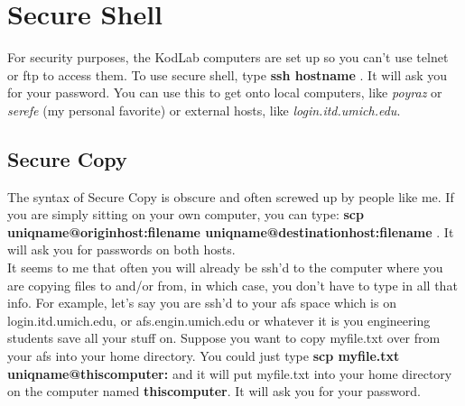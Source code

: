 \documentclass[12pt, letterpaper]{article}
\begin{document}
\section{Secure Shell}
For security purposes, the KodLab computers are set up so you can't
use telnet or ftp to access them.
To use secure shell, type {\bf ssh hostname }. It will ask you for
your password. You can use this to get onto local computers, like {\it 
poyraz} or {\it serefe} (my personal favorite) or external hosts, like 
{\it login.itd.umich.edu}.

\subsection{Secure Copy}
The syntax of Secure Copy is obscure and often screwed up by people
like me. If you are simply sitting on your own computer, you can type:
{\bf scp uniqname@originhost:filename
uniqname@destinationhost:filename }. It will ask you for passwords on
both hosts.\\
It seems to me that often you will already be ssh'd to the computer
where you are copying files to and/or from, in which case, you don't
have to type in all that info. For example, let's say you are ssh'd to 
your afs space which is on login.itd.umich.edu, or afs.engin.umich.edu 
or whatever it is you engineering students save all your stuff
on. Suppose you want to copy myfile.txt over from your afs into your
home directory. You could
just type {\bf scp myfile.txt uniqname@thiscomputer: } and it will put 
myfile.txt into your home directory on the computer named {\bf
thiscomputer}. It will ask you for your password.
\end{document}
